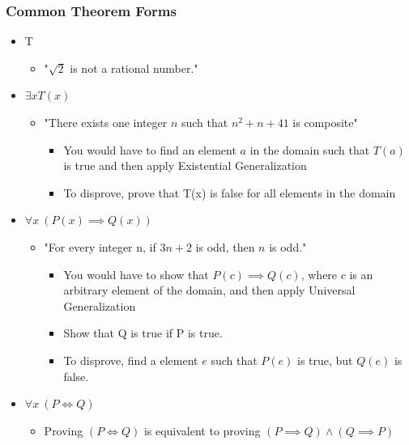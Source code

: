 \documentclass[12pt, letterpaper]{article}
\begin{document}
\subsubsection*{Common Theorem Forms}
\begin{itemize}[leftmargin=*, label={}]
	\item T
	\begin{itemize}[label={\tiny ex:}, leftmargin=1.25cm]
		\item "$\sqrt{2}$ is not a rational number."
	\end{itemize}
	\item \textbf{$\exists x T(x)$}
	\begin{itemize}[label={\tiny ex:},  leftmargin=1.25cm]
		\item "There exists one integer $n$ such that $n^2 + n + 41$ is composite"
		\begin{itemize}
			\item {\small You would have to find an element $a$ in the domain such that $T(a)$ is true and then apply Existential Generalization}
			\item {\small To disprove, prove that T(x) is false for all elements in the domain}
		\end{itemize}
	\end{itemize}
	\item $\forall x \ (P(x) \implies Q(x))$
	\begin{itemize}[label={\tiny ex:}, leftmargin=1.25cm]
		\item "For every integer n, if $3n+2$ is odd, then $n$ is odd."
		\begin{itemize}
			\item {\small You would have to show that $P(c) \implies Q(c)$, where $c$ is an arbitrary element of the domain, and then apply Universal Generalization}
			\item {\small Show that Q is true if P is true.}
			\item {\small To disprove, find a element $e$ such that $P(e)$ is true, but $Q(e)$ is false.}
		\end{itemize}
	\end{itemize}
	\item $\forall x \ (P \iff Q)$
	\begin{itemize}[label={\small \faInfoCircle}, leftmargin=1.25cm]
		\item Proving $(P \iff Q)$ is equivalent to proving $(P \implies Q) \land (Q \implies P)$
	\end{itemize}
\end{itemize}
\pagebreak
\end{document}
